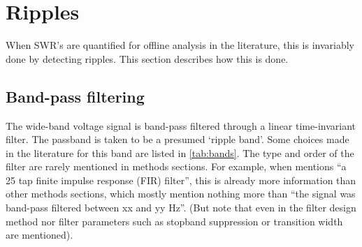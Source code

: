 
\section{Ripples}


When SWR's are quantified for offline analysis in the literature, this is
invariably done by detecting ripples. This section describes how this is done.



\subsection{Band-pass filtering}

The wide-band voltage signal is band-pass filtered through a linear time-invariant filter. The passband is taken to be a presumed `ripple band'. Some choices made in the literature for this band are listed in \cref{tab:bands}. The type and order of the filter are rarely mentioned in methods sections. For example, when  mentions ``a 25 tap finite impulse response (FIR) filter'', this is already more information than other methods sections, which mostly mention nothing more than ``the signal was band-pass filtered between xx and yy \si{\hertz}''. (But note that even in  the filter design method nor filter parameters such as stopband suppression or transition width are mentioned).

